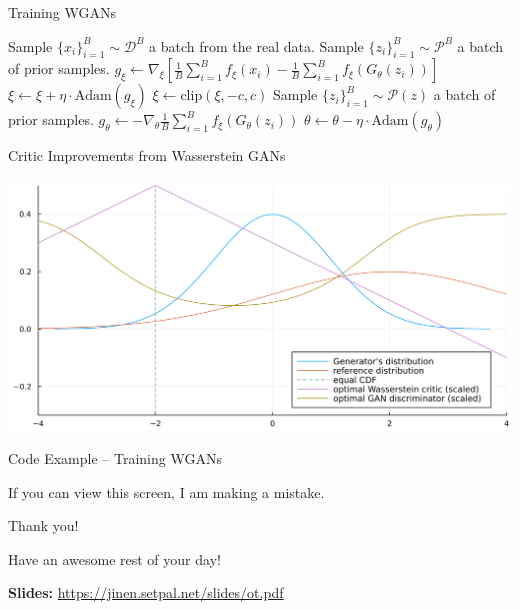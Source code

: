 \documentclass{beamer}
\begin{document}
\begin{frame}{Training WGANs}
	\begin{algorithm}[H]
		\caption{WGAN training algorithm. $\eta = 10^{-5},~c=0.01,~n_{\text{critic}}=5,~n_{\text{iter}} = 500$.}\label{algo::wgan}
		\begin{algorithmic}[1]
			\State Sample $\{x_i\}_{i=1}^B \sim \mathcal{D}^B$ a batch from the real data.
			\State Sample $\{z_i\}_{i=1}^B \sim \mathcal{P}^B$ a batch of prior samples.
			\State $g_\xi \gets \nabla_\xi \left[\frac{1}{B}\sum_{i=1}^B f_\xi(x_i) - \frac{1}{B} \sum_{i=1}^B f_\xi(G_\theta(z_i)) \right]$
			\State $\xi \gets \xi + \eta \cdot \text{Adam}(g_\xi) $
			\State $\xi \gets \text{clip}(\xi, -c, c) $
			\EndFor
			\State Sample $\{z_i\}_{i=1}^B \sim \mathcal{P}(z)$ a batch of prior samples.
			\State $g_\theta \gets -\nabla_\theta \frac{1}{B} \sum_{i=1}^B f_\xi(G_\theta(z_i))$ 
			\State $\theta \gets \theta - \eta \cdot \text{Adam}(g_\theta)$
			\EndFor
		\end{algorithmic}
	\end{algorithm}
\end{frame}

\begin{frame}{Critic Improvements from Wasserstein GANs}
	\begin{center}
		\includegraphics[width=\textwidth]{img/wgan_grad_compare.png}
	\end{center}
\end{frame}

\begin{frame}{Code Example -- Training WGANs}
	\begin{center}
		If you can view this screen, I am making a mistake.
	\end{center}
\end{frame}

\begin{frame}{Thank you!}
	\begin{center}
		Have an awesome rest of your day!
	\end{center}
	\begin{center}
		\textbf{Slides:} \url{https://jinen.setpal.net/slides/ot.pdf}
	\end{center}
\end{frame}
\end{document}
